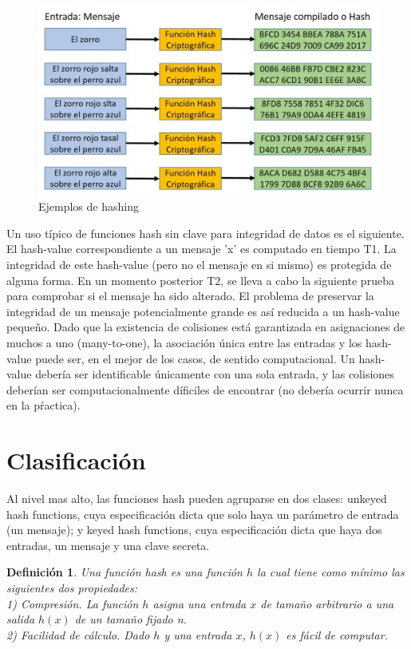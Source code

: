 \documentclass[a4paper, 12pt]{article} %
\newtheorem*{mydef1}{Definición} %
\begin{document}
\newpage
\begin{figure}[h!]
	    \centering
	    \includegraphics[width=1\textwidth]{images/imagen_intro.jpg}
	    \caption{Ejemplos de hashing}
	    \label{fig:Ejemplos_hashing}
\end{figure}

Un uso típico de funciones hash sin clave para integridad de datos es el siguiente. El hash-value
correspondiente a un mensaje 'x' es computado en tiempo T1. La integridad de este hash-value
(pero no el mensaje en si mismo) es protegida de alguna forma. En un momento posterior T2, se
lleva a cabo la siguiente prueba para comprobar si el mensaje ha sido alterado. El problema
de preservar la integridad de un mensaje potencialmente grande es así reducida a un hash-value
pequeño. Dado que la existencia de colisiones está garantizada en asignaciones de muchos a uno
(many-to-one), la asociación única entre las entradas y los hash-value puede ser, en el mejor
de los casos, de sentido computacional. Un hash-value debería ser identificable únicamente con
una sola entrada, y las colisiones deberían ser computacionalmente díficiles de encontrar (no
debería ocurrir nunca en la pŕactica).

\newpage
\section{Clasificación}
Al nivel mas alto, las funciones hash pueden agruparse en dos clases: unkeyed hash functions,
cuya especificación dicta que solo haya un parámetro de entrada (un mensaje); y keyed
hash functions, cuya especificación dicta que haya dos entradas, un mensaje y una clave secreta.

\begin{mydef1}
Una función hash es una función $h$ la cual tiene como mínimo las siguientes dos
propiedades:\\ 1) Compresión. La función $h$ asigna una entrada $x$ de tamaño arbitrario a una
salida $h(x)$ de un tamaño fijado n.\\
2) Facilidad de cálculo. Dado $h$ y una entrada $x$, $h(x)$ es fácil de computar.
\end{mydef1}
\end{document}
